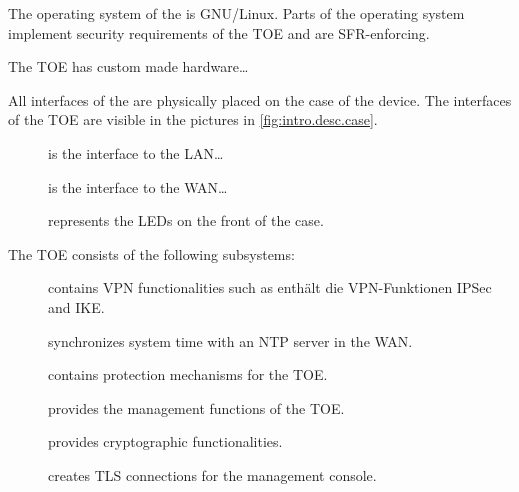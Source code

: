 

The operating system of the \thisproduct{} is GNU/Linux. Parts of the operating
system implement security requirements of the TOE and are SFR-enforcing.



The TOE has custom made hardware\dots{}



All interfaces of the \thisproduct{} are physically placed on the case of the
device. The interfaces of the TOE are visible in the pictures in
\autoref{fig:intro.desc.case}.

\begin{description}
\item[] is the interface to the LAN\dots
\item[] is the interface to the WAN\dots
\item[] represents the LEDs on the front of the case.
\end{description}



\clearpage


The TOE consists of the following subsystems:

\begin{description}
\item[] contains VPN functionalities such as enthält die
  VPN-Funktionen IPSec and IKE.
\item[] synchronizes system time with an NTP server in the WAN.
\item[] contains protection mechanisms for the TOE.
\item[] provides the management functions of the TOE.
\item[] provides cryptographic functionalities.
\item[] creates TLS connections for the management console.
\end{description}

